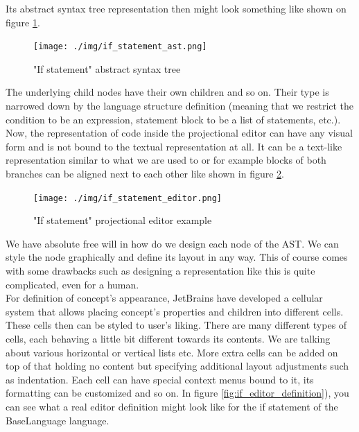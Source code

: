 \vspace{3mm}

Its abstract syntax tree representation then might look something like shown on figure \ref{fig:if_ast}.
\\

\begin{figure}[h]
	\centering
	\texttt{[image: ./img/if\_statement\_ast.png]}
	\caption{"If statement" abstract syntax tree}
	\label{fig:if_ast}
\end{figure}

The underlying child nodes have their own children and so on.
Their type is narrowed down by the language structure definition (meaning that we restrict the condition to be an expression, statement block to be a list of statements, etc.).
\\

Now, the representation of code inside the projectional editor can have any visual form and is not bound to the textual representation at all.
It can be a text-like representation similar to what we are used to or for example blocks of both branches can be aligned next to each other like shown in figure \ref{fig:if_editor}.
\\

\begin{figure}[h]
	\centering
	\hspace{-4mm}
	\texttt{[image: ./img/if\_statement\_editor.png]}
	\caption{"If statement" projectional editor example}
	\label{fig:if_editor}
\end{figure}

We have absolute free will in how do we design each node of the AST.
We can style the node graphically and define its layout in any way.
This of course comes with some drawbacks such as designing a representation like this is quite complicated, even for a human.
\\

For definition of concept's appearance, JetBrains have developed a cellular system that allows placing concept's properties and children into different cells.
These cells then can be styled to user's liking.
There are many different types of cells, each behaving a little bit different towards its contents.
We are talking about various horizontal or vertical lists etc.
More extra cells can be added on top of that holding no content but specifying additional layout adjustments such as indentation.
Each cell can have special context menus bound to it, its formatting can be customized and so on.
In figure {\ref{fig:if_editor_definition})}, you can see what a real editor definition might look like for the if statement of the BaseLanguage language.

